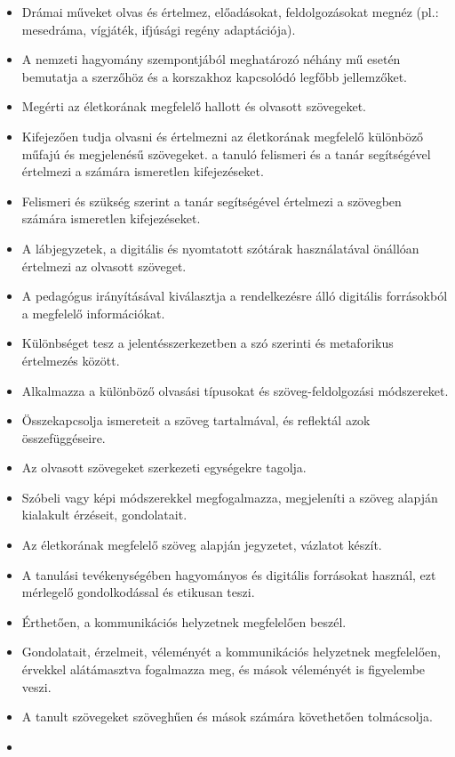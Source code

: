 \begin{itemize}
\item
  Drámai műveket olvas és értelmez, előadásokat, feldolgozásokat megnéz
  (pl.: mesedráma, vígjáték, ifjúsági regény adaptációja).
\item
  A nemzeti hagyomány szempontjából meghatározó néhány mű esetén
  bemutatja a szerzőhöz és a korszakhoz kapcsolódó legfőbb jellemzőket.
\item
  Megérti az életkorának megfelelő hallott és olvasott szövegeket.
\item
  Kifejezően tudja olvasni és értelmezni az életkorának megfelelő
  különböző műfajú és megjelenésű szövegeket. a tanuló felismeri és a
  tanár segítségével értelmezi a számára ismeretlen kifejezéseket.
\item
  Felismeri és szükség szerint a tanár segítségével értelmezi a
  szövegben számára ismeretlen kifejezéseket.
\item
  A lábjegyzetek, a digitális és nyomtatott szótárak használatával
  önállóan értelmezi az olvasott szöveget.
\item
  A pedagógus irányításával kiválasztja a rendelkezésre álló digitális
  forrásokból a megfelelő információkat.
\item
  Különbséget tesz a jelentésszerkezetben a szó szerinti és metaforikus
  értelmezés között.
\item
  Alkalmazza a különböző olvasási típusokat és szöveg-feldolgozási
  módszereket.
\item
  Összekapcsolja ismereteit a szöveg tartalmával, és reflektál azok
  összefüggéseire.
\item
  Az olvasott szövegeket szerkezeti egységekre tagolja.
\item
  Szóbeli vagy képi módszerekkel megfogalmazza, megjeleníti a szöveg
  alapján kialakult érzéseit, gondolatait.
\item
  Az életkorának megfelelő szöveg alapján jegyzetet, vázlatot készít.
\item
  A tanulási tevékenységében hagyományos és digitális forrásokat
  használ, ezt mérlegelő gondolkodással és etikusan teszi.
\item
  Érthetően, a kommunikációs helyzetnek megfelelően beszél.
\item
  Gondolatait, érzelmeit, véleményét a kommunikációs helyzetnek
  megfelelően, érvekkel alátámasztva fogalmazza meg, és mások véleményét
  is figyelembe veszi.
\item
  A tanult szövegeket szöveghűen és mások számára követhetően
  tolmácsolja.
\item

\end{itemize}

